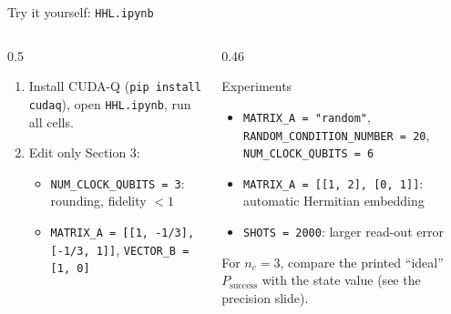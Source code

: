 \documentclass[aspectratio=169,11pt]{beamer}
\begin{document}
\begin{frame}{Try it yourself: \texttt{HHL.ipynb}}
  \begin{columns}[T]
    \begin{column}{0.5\textwidth}
      \begin{enumerate}
        \item Install CUDA-Q (\texttt{pip install cudaq}), open \texttt{HHL.ipynb}, run all cells.
        \item Edit only Section 3:
          \begin{itemize}
            \item \texttt{NUM\_CLOCK\_QUBITS = 3}: rounding, fidelity $< 1$
            \item \texttt{MATRIX\_A = [[1, -1/3], [-1/3, 1]]}, \texttt{VECTOR\_B = [1, 0]}
          \end{itemize}
      \end{enumerate}
    \end{column}
    \begin{column}{0.46\textwidth}
      \begin{block}{Experiments}
        \begin{itemize}
          \item \texttt{MATRIX\_A = "random"}, \texttt{RANDOM\_CONDITION\_NUMBER = 20}, \texttt{NUM\_CLOCK\_QUBITS = 6}
          \item \texttt{MATRIX\_A = [[1, 2], [0, 1]]}: automatic Hermitian embedding
          \item \texttt{SHOTS = 2000}: larger read-out error
        \end{itemize}
      \end{block}
      \small For $n_c = 3$, compare the printed ``ideal'' $P_{\text{success}}$ with the state value (see the precision slide).
    \end{column}
  \end{columns}
\end{frame}

\end{document}

